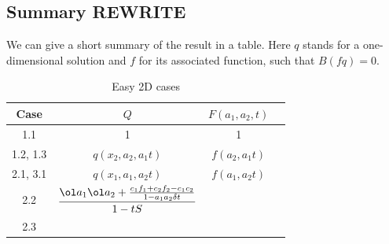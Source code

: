 \subsection{Summary REWRITE}
We can give a short summary of the result in a table. Here $q$ stands for a one-dimensional solution and $f$ for its associated function, such that $B(fq) = 0$.
 \begin{table}[H]
    \caption{Easy 2D cases}
    \label{tbl:table2d}
    \centering
    \begin{tabular}{cccc}
    \toprule
    Case  & $Q$ & $F(a_1,a_2,t)$\\
    \midrule
    1.1  & 1 & 1 \\
    1.2, 1.3  & $q(x_2,a_2,a_1t)$ & $f(a_2,a_1t)$ \\
    2.1, 3.1 &  $q(x_1,a_1,a_2t)$ & $f(a_1,a_2t)$\\
    2.2  & $\dfrac{\ol a_1 \ol a_2+ \tfrac{c_1 f_1 + c_2 f_2- c_1 c_2}{1-a_1a_2 \delta t}}{1-tS}$ & \\
    2.3  & &\\
    \bottomrule
    \end{tabular}
\end{table}



\endinput